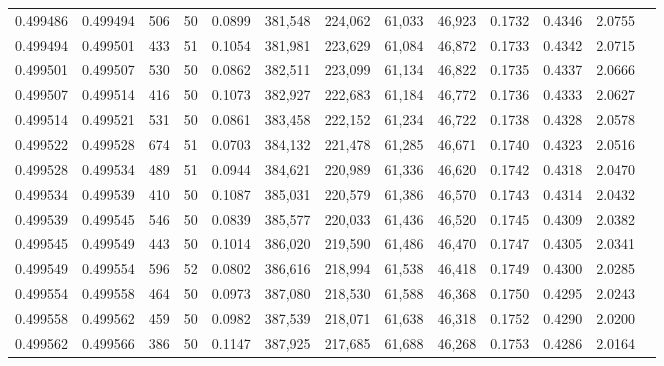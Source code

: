 \begin{tabular}{rrrrrrrrrrrrr}
0.499486 & 0.499494 & 506 &  50 &                                     0.0899 & 381,548 & 224,062 &  61,033 &  46,923 & 0.1732 & 0.4346 & 2.0755 \\
0.499494 & 0.499501 & 433 &  51 &                                     0.1054 & 381,981 & 223,629 &  61,084 &  46,872 & 0.1733 & 0.4342 & 2.0715 \\
0.499501 & 0.499507 & 530 &  50 &                                     0.0862 & 382,511 & 223,099 &  61,134 &  46,822 & 0.1735 & 0.4337 & 2.0666 \\
0.499507 & 0.499514 & 416 &  50 &                                     0.1073 & 382,927 & 222,683 &  61,184 &  46,772 & 0.1736 & 0.4333 & 2.0627 \\
0.499514 & 0.499521 & 531 &  50 &                                     0.0861 & 383,458 & 222,152 &  61,234 &  46,722 & 0.1738 & 0.4328 & 2.0578 \\
0.499522 & 0.499528 & 674 &  51 &                                     0.0703 & 384,132 & 221,478 &  61,285 &  46,671 & 0.1740 & 0.4323 & 2.0516 \\
0.499528 & 0.499534 & 489 &  51 &                                     0.0944 & 384,621 & 220,989 &  61,336 &  46,620 & 0.1742 & 0.4318 & 2.0470 \\
0.499534 & 0.499539 & 410 &  50 &                                     0.1087 & 385,031 & 220,579 &  61,386 &  46,570 & 0.1743 & 0.4314 & 2.0432 \\
0.499539 & 0.499545 & 546 &  50 &                                     0.0839 & 385,577 & 220,033 &  61,436 &  46,520 & 0.1745 & 0.4309 & 2.0382 \\
0.499545 & 0.499549 & 443 &  50 &                                     0.1014 & 386,020 & 219,590 &  61,486 &  46,470 & 0.1747 & 0.4305 & 2.0341 \\
0.499549 & 0.499554 & 596 &  52 &                                     0.0802 & 386,616 & 218,994 &  61,538 &  46,418 & 0.1749 & 0.4300 & 2.0285 \\
0.499554 & 0.499558 & 464 &  50 &                                     0.0973 & 387,080 & 218,530 &  61,588 &  46,368 & 0.1750 & 0.4295 & 2.0243 \\
0.499558 & 0.499562 & 459 &  50 &                                     0.0982 & 387,539 & 218,071 &  61,638 &  46,318 & 0.1752 & 0.4290 & 2.0200 \\
0.499562 & 0.499566 & 386 &  50 &                                     0.1147 & 387,925 & 217,685 &  61,688 &  46,268 & 0.1753 & 0.4286 & 2.0164 \\

\end{tabular}
